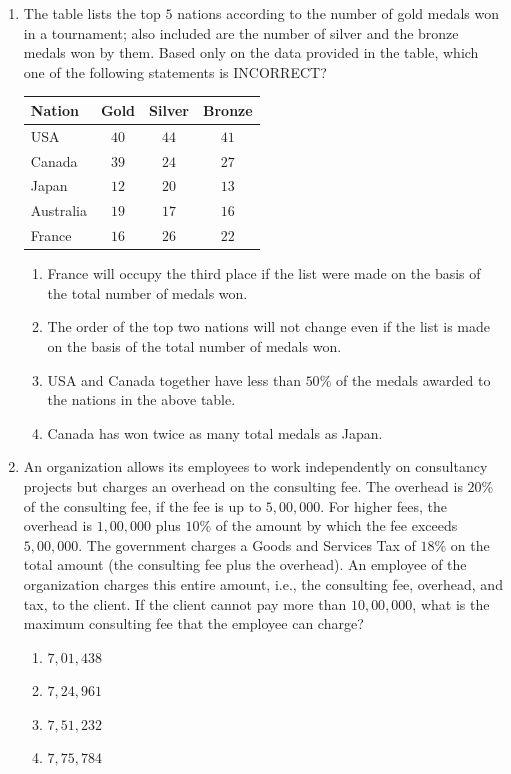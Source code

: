 \documentclass[journal]{IEEEtran}
\begin{document}
\begin{enumerate}
    \item The table lists the top $5$ nations according to the number of gold medals won in a tournament;
also included are the number of silver and the bronze medals won by them.
Based only on the data provided in the table, which one of the following statements is INCORRECT?
\begin{center}
    \begin{tabular}{|l|c|c|c|}
        \hline
        \textbf{Nation} & \textbf{Gold} & \textbf{Silver} & \textbf{Bronze} \\ \hline
        USA & $40$ & $44$ & $41$ \\
        Canada & $39$ & $24$ & $27$ \\
        Japan & $12$ & $20$ & $13$ \\
        Australia & $19$ & $17$ & $16$ \\
        France & $16$ & 
$26$ & $22$ \\ \hline
    \end{tabular}
    \end{center}
    \begin{enumerate}
        \item France will occupy the third place if the list were made on the basis of the total number of medals won.
\item The order of the top two nations will not change even if the list is made on the basis of the total number of medals won.
\item USA and Canada together have less than $50$\% of the medals awarded to the nations in the above table.
\item Canada has won twice as many total medals as Japan.
\end{enumerate}

    \item An organization allows its employees to work independently on consultancy projects but charges an overhead on the consulting fee.
The overhead is $20$\% of the consulting fee, if the fee is up to $5,00,000$.
For higher fees, the overhead is $1,00,000$ plus $10$\% of the amount by which the fee exceeds $5,00,000$.
The government charges a Goods and Services Tax of $18$\% on the total amount (the consulting fee plus the overhead).
An employee of the organization charges this entire amount, i.e., the consulting fee, overhead, and tax, to the client.
If the client cannot pay more than $10,00,000$, what is the maximum consulting fee that the employee can charge?
\begin{multicols}{2}
    \begin{enumerate}
        \item $7,01,438$
        \item $7,24,961$
        \item $7,51,232$
        \item $7,75,784$
    \end{enumerate}
    \end{multicols}
\end{enumerate}
\clearpage
\end{document}
